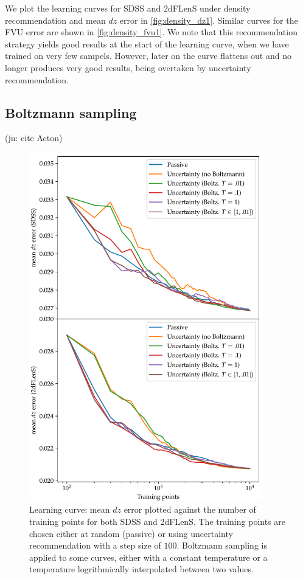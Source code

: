 \documentclass[11pt,twoside,openright]{report}
\newcommand\jn[1]{{\color{red}(jn: #1)}}
\begin{document}
  We plot the learning curves for SDSS and 2dFLenS under density recommendation and mean $dz$ error in \cref{fig:density_dz1}. Similar curves for the FVU error are shown in \cref{fig:density_fvu1}. We note that this recommendation strategy yields good results at the start of the learning curve, when we have trained on very few sampels. However, later on the curve flattens out and no longer produces very good results, being overtaken by uncertainty recommendation.

\subsection{Boltzmann sampling}

  \jn{cite Acton}

  \begin{figure}
    \centering
    \includegraphics[width=0.9\textwidth]{boltz_uncertainty_dz1.pdf}
    \caption{Learning curve: mean $dz$ error plotted against the number of training points for both SDSS and 2dFLenS. The training points are chosen either at random (passive) or using uncertainty recommendation with a step size of $100$. Boltzmann sampling is applied to some curves, either with a constant temperature or a temperature logrithmically interpolated between two values.}
    \label{fig:boltz_uncertainty_dz1}
  \end{figure}
\end{document}
